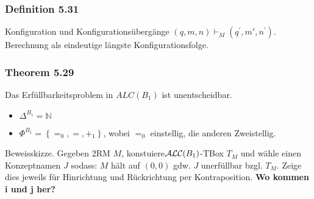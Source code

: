 \begin{definition}[2-Registermaschinenberechnung]

\end{definition}

\subsubsection{Definition 5.31}\label{definition-5.31}

Konfiguration und Konfigurationsübergänge
$\left( q,m,n \right) \vdash_{M}(q^{'},m',n^{'})$. Berechnung als
eindeutige längste Konfigurationsfolge.

\subsubsection{Theorem 5.29}\label{theorem-5.29}

Das Erfüllbarkeitsproblem in $ALC(B_1)$ ist unentscheidbar.

\begin{itemize}
\item
  $\Delta^{B_1}\mathbb{= N}$
\item
  $\Phi^{B_1} = \left\{ =_{0}, = , +_1 \right\}$, wobei $=_{0}$
  einstellig, die anderen Zweistellig.
\end{itemize}

Beweisskizze. Gegeben 2RM $M$,
konstuiere$\text {$\ALC$}\left( B_1 \right)$-TBox $T_{M}$ und wähle
einen Konzeptnamen $J$ sodass: $M$ hält auf $\left( 0,0 \right)$
gdw. $J$ unerfüllbar bzgl. $T_{M}$. Zeige dies jeweils für
Hinrichtung und Rückrichtung per Kontraposition. \textbf{Wo kommen i und
j her?}
